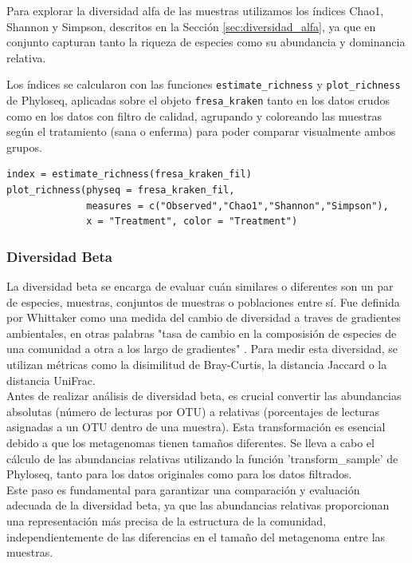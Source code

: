 Para explorar la diversidad alfa de las muestras utilizamos los índices Chao1, Shannon y Simpson,
descritos en la Sección \ref{sec:diversidad_alfa}, ya que en conjunto capturan tanto la riqueza
de especies como su abundancia y dominancia relativa.\\

{\sloppy Los índices se calcularon con las funciones \texttt{estimate\_richness} y
\texttt{plot\_richness} de Phyloseq, aplicadas sobre el objeto \texttt{fresa\_kraken} tanto en los datos crudos como
en los datos con filtro de calidad, agrupando y coloreando las muestras según el tratamiento
(sana o enferma) para poder comparar visualmente ambos grupos.\par}

\begin{lstlisting}[basicstyle=\small]
index = estimate_richness(fresa_kraken_fil)
plot_richness(physeq = fresa_kraken_fil,
              measures = c("Observed","Chao1","Shannon","Simpson"),
              x = "Treatment", color = "Treatment")
\end{lstlisting}


\subsubsection{Diversidad Beta}
La diversidad beta se encarga de evaluar cuán similares o diferentes son un par de especies, 
muestras, conjuntos de muestras o poblaciones entre sí. Fue definida por Whittaker como una medida 
del cambio de diversidad a traves de gradientes ambientales, en otras palabras "tasa de cambio en la 
composisión de especies de una comunidad a otra a los largo de gradientes" \citep{whittaker1960vegetation}. 
Para medir esta diversidad, se utilizan métricas como la disimilitud de Bray-Curtis, la distancia 
Jaccard o la distancia UniFrac.\\

Antes de realizar análisis de diversidad beta, es crucial convertir las abundancias absolutas 
(número de lecturas por OTU) a relativas (porcentajes de lecturas asignadas a un OTU dentro de una 
muestra). Esta transformación es esencial debido a que los metagenomas tienen tamaños diferentes. 
Se lleva a cabo el cálculo de las abundancias relativas utilizando la función 'transform\_sample' de 
Phyloseq, tanto para los datos originales como para los datos filtrados.\\

Este paso es fundamental para garantizar una comparación y evaluación adecuada de la diversidad beta, 
ya que las abundancias relativas proporcionan una representación más precisa de la estructura de la 
comunidad, independientemente de las diferencias en el tamaño del metagenoma entre las muestras.\\

